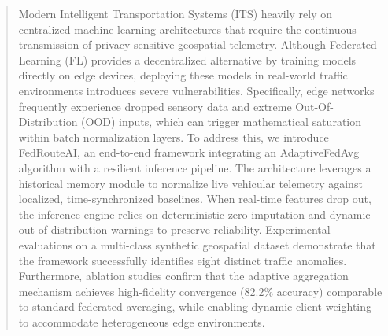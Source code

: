 \begin{abstract}
Modern Intelligent Transportation Systems (ITS) heavily rely on centralized machine learning architectures that require the continuous transmission of privacy-sensitive geospatial telemetry. Although Federated Learning (FL) provides a decentralized alternative by training models directly on edge devices, deploying these models in real-world traffic environments introduces severe vulnerabilities. Specifically, edge networks frequently experience dropped sensory data and extreme Out-Of-Distribution (OOD) inputs, which can trigger mathematical saturation within batch normalization layers. To address this, we introduce FedRouteAI, an end-to-end framework integrating an AdaptiveFedAvg algorithm with a resilient inference pipeline. The architecture leverages a historical memory module to normalize live vehicular telemetry against localized, time-synchronized baselines. When real-time features drop out, the inference engine relies on deterministic zero-imputation and dynamic out-of-distribution warnings to preserve reliability. Experimental evaluations on a multi-class synthetic geospatial dataset demonstrate that the framework successfully identifies eight distinct traffic anomalies. Furthermore, ablation studies confirm that the adaptive aggregation mechanism achieves high-fidelity convergence (82.2\% accuracy) comparable to standard federated averaging, while enabling dynamic client weighting to accommodate heterogeneous edge environments.
\end{abstract}
